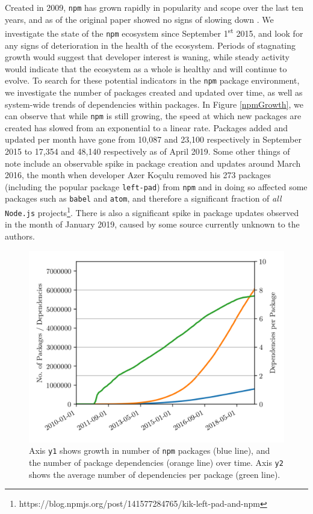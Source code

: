 \documentclass[10pt,conference]{IEEEtran}
\def\code#1{\texttt{#1}}
\begin{document}
Created in 2009, \code{npm} has grown
rapidly in popularity and scope over the last ten years, and 
as of the original paper showed no signs of slowing down \cite{Wittern:2016}.
We investigate the state of the \code{npm} ecosystem
since September 1\textsuperscript{st} 2015, and look for any signs of deterioration in 
the health of the ecosystem. Periods of stagnating growth would suggest
that developer interest is waning, while steady activity would 
indicate that the ecosystem as a whole is healthy and will continue to
evolve. To search for these potential indicators in the \code{npm} package environment,
we investigate the number of packages created and updated over time, as well
as system-wide trends of dependencies within packages. 
In Figure \ref{npmGrowth},
we can observe that while \code{npm} is still growing, the speed at which new packages
are created has slowed from an exponential to a linear rate. Packages added and updated 
per month have gone from 10,087 and 23,100 respectively in September 2015 to 17,354 and 48,140 respectively as of April 2019.
Some other things of note include an observable spike in package creation and updates around March 2016, the month 
when developer Azer Ko\c{c}ulu removed his 273 packages (including the popular package 
\code{left-pad}) from \code{npm} and in doing so affected some packages such as 
\code{babel} and \code{atom}, and therefore a significant fraction of \emph{all} 
\code{Node.js} projects\footnote{https://blog.npmjs.org/post/141577284765/kik-left-pad-and-npm}.
There is also a significant spike in package updates observed in the month of January 2019, caused 
by some source currently unknown to the authors.

\begin{figure}
  \includegraphics[width=1\linewidth]{figures/packages_vs_dependencies.png}
  \caption{Axis \code{y1} shows growth in number of \code{npm} packages (blue line), and the number of package dependencies (orange line) over time. 
  Axis \code{y2} shows the average number of dependencies per package (green line).}
  \label{packVSDependencies}
\end{figure}
\end{document}
